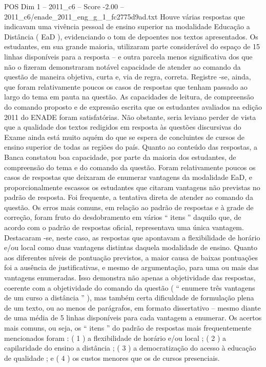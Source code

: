 \begin{textsample}{POS Dim 1 – 2011\_c6 – Score -2.00 – 2011\_c6/enade\_2011\_eng\_g\_1\_fc2775d9ad.txt}
Houve várias respostas que indicavam uma vivência pessoal de ensino superior na modalidade Educação a Distância ( EaD ), evidenciando o tom de depoentes nos textos apresentados.
Os estudantes, em sua grande maioria, utilizaram parte considerável do espaço de 15 linhas disponíveis para a resposta – e outra parcela menos significativa dos que não o fizeram demonstraram notável capacidade de atender ao comando da questão de maneira objetiva, curta e, via de regra, correta.
Registre -se, ainda, que foram relativamente poucos os casos de respostas que tenham passado ao largo do tema em pauta na questão.
As capacidades de leitura, de compreensão do comando proposto e de expressão escrita que os estudantes avaliados na edição 2011 do ENADE foram satisfatórias.
Não obstante, seria leviano perder de vista que a qualidade dos textos redigidos em resposta às questões discursivas do Exame ainda está muito aquém do que se espera de concluintes de cursos de ensino superior de todas as regiões do país.
Quanto ao conteúdo das respostas, a Banca constatou boa capacidade, por parte da maioria dos estudantes, de compreensão do tema e do comando da questão.
Foram relativamente poucos os casos de respostas que deixaram de enumerar vantagens da modalidade EaD, e proporcionalmente escassos os estudantes que citaram vantagens não previstas no padrão de resposta.
Foi frequente, a tentativa direta de atender ao comando da questão.
Os erros mais comuns, em relação ao padrão de respostas e à grade de correção, foram fruto do desdobramento em vários “ itens ” daquilo que, de acordo com o padrão de respostas oficial, representava uma única vantagem.
Destacaram -se, neste caso, as respostas que apontavam a flexibilidade de horário e/ou local como duas vantagens distintas daquela modalidade de ensino.
Quanto aos diferentes níveis de pontuação previstos, a maior causa de baixas pontuações foi a ausência de justificativas, e mesmo de argumentação, para uma ou mais das vantagens enumeradas.
Isso demonstra não apenas a objetividade das respostas, coerente com a objetividade do comando da questão ( “ enumere três vantagens de um curso a distância ” ), mas também certa dificuldade de formulação plena de um texto, ou ao menos de parágrafos, em formato dissertativo – mesmo diante de uma média de 5 linhas disponíveis para cada vantagem a enumerar.
Os acertos mais comuns, ou seja, os “ itens ” do padrão de respostas mais frequentemente mencionados foram : ( 1 ) a flexibilidade de horário e/ou local ; ( 2 ) a capilaridade do ensino a distância ; ( 3 ) a democratização do acesso à educação de qualidade ; e ( 4 ) os custos menores que os de cursos presenciais.

\end{textsample}
